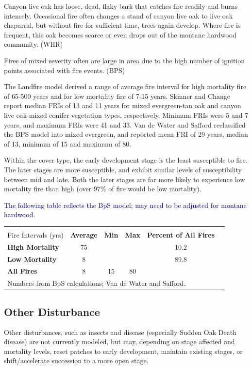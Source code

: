 \documentclass{article}
\newcommand{\mcomment}[1]{\textcolor{navy}{#1}}
\begin{document}
Canyon live oak has loose, dead, flaky bark that catches fire readily and burns intensely. Occasional fire often changes a stand of canyon live oak to live oak chaparral, but without fire for sufficient time, trees again develop. Where fire is frequent, this oak becomes scarce or even drops out of the montane hardwood community. (WHR)

Fires of mixed severity often are large in area due to the high number of ignition points associated with fire events. (BPS)

The Landfire model derived a range of average fire interval for high mortality fire of 65-500 years and for low mortality fire of 7-15 years. Skinner and Change report median FRIs of 13 and 11 years for mixed evergreen-tan oak and canyon live oak-mixed conifer vegetation types, respectively. Minimum FRIs were 5 and 7 years, and maximum FRIs were 41 and 33. Van de Water and Safford reclassified the BPS model into mixed evergreen, and reported mean FRI of 29 years, median of 13, minimum of 15 and maximum of 80.

Within the cover type, the early development stage is the least susceptible to fire. The later stages are more susceptible, and exhibit similar levels of susceptibility between mid and late. Both the later stages are far more likely to experience low mortality fire than high (over 97\% of fire would be low mortality).


\mcomment{The following table reflects the BpS model; may need to be adjusted for montane hardwood.}
\begin{center}
\vspace{.1in}
\begin{tabular}{l|ccccc}
\hline 
\\[-2ex]
 \large Fire Intervals {\small(yrs)} & \textbf{Average} & \textbf{Min} & \textbf{Max} & \textbf{Percent of All Fires} \\
 \hline
 \textbf{High Mortality}	& 75 & 		& 		& 10.2 	\\
 \textbf{Low Mortality} 	& 8 & 		& 		& 89.8 	\\
 \textbf{All Fires} 		& 8 & 	 15	& 80	 	& 		\\
 \multicolumn{5}{l}{\small Numbers from BpS calculations; Van de Water and Safford.}\\
\hline
\end{tabular}
\end{center}

\subsection*{Other Disturbance}
Other disturbances, such as insects and disease (especially Sudden Oak Death disease) are not currently modeled, but may, depending on stage affected and mortality levels, reset patches to early development, maintain existing stages, or shift/accelerate succession to a more open stage.
\end{document}

